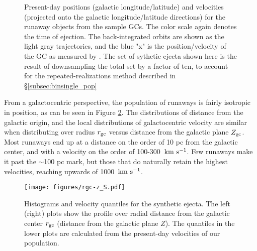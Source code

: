 \documentclass[twocolumn]{aastex631}
\newcommand{\kms}{${\rm km~s^{-1}}$}
\begin{document}
\begin{figure*}
    \caption{
        Present-day positions (galactic longitude/latitude) and velocities (projected onto the galactic longitude/latitude directions) for the runaway objects from the sample GCs.
        The color scale again denotes the time of ejection.
        The back-integrated orbits are shown as the light gray trajectories, and the blue "x" is the position/velocity of the GC as measured by \citet{2018MNRAS.478.1520B}.
        The set of sythetic ejecta shown here is the result of downsampling the total set by a factor of ten, to account for the repeated-realizations method described in \S\ref{subsec:binsingle_pop}
    }
    \label{fig:gcej_today}
\end{figure*}

From a galactocentric perspective, the population of runaways is fairly isotropic in position, as can be seen in Figure \ref{fig:rgc-z}.
The distributions of distance from the galactic origin, and the local distributions of galactocentric velocity are similar when distributing over radius $r_{\rm gc}$ versus distance from the galactic plane $Z_{\rm gc}$.
Most runaways end up at a distance on the order of 10 pc from the galactic center, and with a velocity on the order of 100-300~\kms.
Few runaways make it past the $\sim$100 pc mark, but those that do naturally retain the highest velocities, reaching upwards of 1000~\kms.

\begin{figure*}
    \begin{centering}
        \texttt{[image: figures/rgc-z\_S.pdf]}
        \caption{
            Histograms and velocity quantiles for the synthetic ejecta.
            The left (right) plots show the profile over radial distance from the galactic center $r_{\rm gc}$ (distance from the galactic plane $Z$).
            The quantiles in the lower plots are calculated from the present-day velocities of our population.
        }
        \label{fig:rgc-z}
    \end{centering}
\end{figure*}
\end{document}
